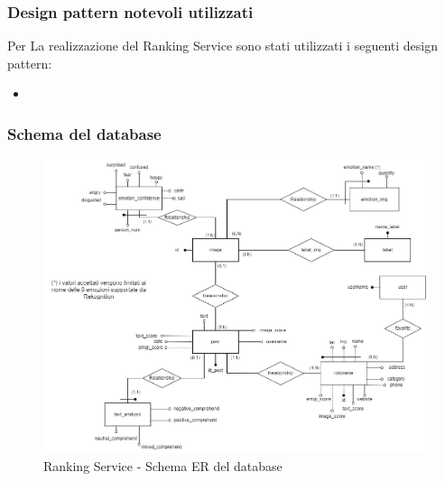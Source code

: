 \subsubsection{Design pattern notevoli utilizzati}
Per La realizzazione del Ranking Service sono stati utilizzati i seguenti design pattern:
\begin{itemize}
    \item
\end{itemize}

\subsubsection{Schema del database}
\begin{figure}[h]
    \centering
    \includegraphics[scale=0.35]{Contenuto/Immagini/ER-RS.jpg}
    \caption{Ranking Service - Schema ER del database}
\end{figure}